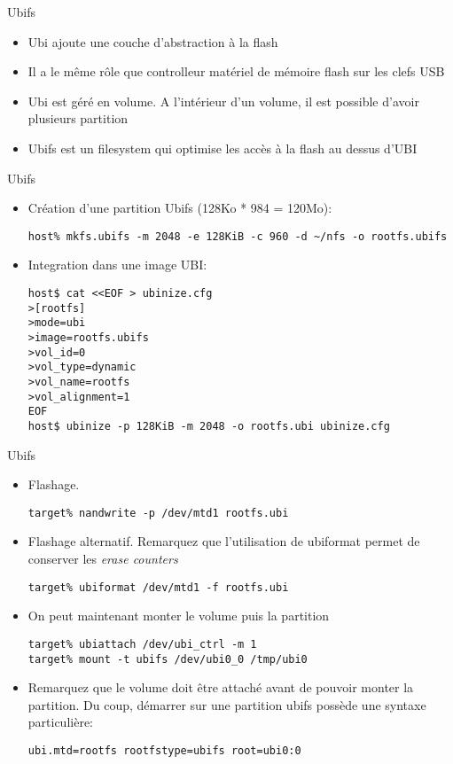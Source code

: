 \begin{frame}[fragile=singleslide]{Ubifs}
  \begin{itemize}
  \item Ubi ajoute une couche d'abstraction à la flash
  \item Il a le même rôle que controlleur matériel de mémoire flash sur les clefs USB
  \item Ubi est géré en volume. A l'intérieur d'un volume, il est possible d'avoir plusieurs partition
  \item Ubifs est un filesystem qui optimise les accès à la flash au dessus d'UBI
  \end{itemize}
\end{frame}

\begin{frame}[fragile=singleslide]{Ubifs}
  \begin{itemize}
    \item Création d'une partition Ubifs (128Ko * 984 = 120Mo):
    \begin{lstlisting}
host% mkfs.ubifs -m 2048 -e 128KiB -c 960 -d ~/nfs -o rootfs.ubifs
     \end{lstlisting}
  \item Integration dans une image UBI:
    \begin{lstlisting}
host$ cat <<EOF > ubinize.cfg
>[rootfs]
>mode=ubi
>image=rootfs.ubifs
>vol_id=0
>vol_type=dynamic
>vol_name=rootfs
>vol_alignment=1
EOF
host$ ubinize -p 128KiB -m 2048 -o rootfs.ubi ubinize.cfg
     \end{lstlisting}

 \end{itemize}
\end{frame}

\begin{frame}[fragile=singleslide]{Ubifs}
  \begin{itemize}
  \item Flashage.
    \begin{lstlisting}
target% nandwrite -p /dev/mtd1 rootfs.ubi
     \end{lstlisting}
  \item Flashage alternatif. Remarquez que l'utilisation de ubiformat permet de
    conserver les \emph{erase counters}
    \begin{lstlisting}
target% ubiformat /dev/mtd1 -f rootfs.ubi
     \end{lstlisting}
  \item On peut maintenant monter le volume puis la partition
    \begin{lstlisting}
target% ubiattach /dev/ubi_ctrl -m 1
target% mount -t ubifs /dev/ubi0_0 /tmp/ubi0
     \end{lstlisting}
     \item Remarquez que le volume doit être attaché avant de pouvoir monter la
       partition. Du coup, démarrer sur une partition ubifs possède une syntaxe
       particulière:
    \begin{lstlisting}
ubi.mtd=rootfs rootfstype=ubifs root=ubi0:0
     \end{lstlisting}
  \end{itemize}
\end{frame}


